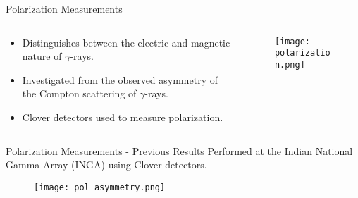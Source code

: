 \documentclass [11pt]{beamer}
\begin{document}
\begin{frame}{Polarization Measurements}
\begin{columns}[c]
\begin{column}{0.7\textwidth}
\begin{itemize}
\item {Distinguishes between the electric and magnetic nature of $\gamma$-rays.}
\item {Investigated from the observed asymmetry of the Compton scattering of $\gamma$-rays.}
\item {Clover detectors used to measure polarization.}
\end{itemize}
\end{column}
\begin{column}{0.3\textwidth}
\begin{figure}
\texttt{[image: polarization.png]}
\end{figure}
\end{column}
\end{columns}
\end{frame}

\begin{frame}{Polarization Measurements - Previous Results}
Performed at the Indian National Gamma Array (INGA) using Clover detectors.
\begin{figure}
\texttt{[image: pol\_asymmetry.png]}
\end{figure}
\end{frame}	
\end{document}
